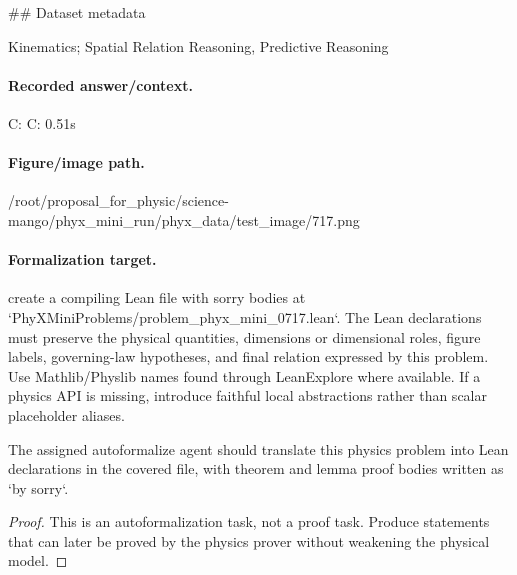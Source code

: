 \#\# Dataset metadata

Kinematics; Spatial Relation Reasoning, Predictive Reasoning

\paragraph{Recorded answer/context.}
C: C: 0.51s

\paragraph{Figure/image path.}
/root/proposal\_for\_physic/science-mango/phyx\_mini\_run/phyx\_data/test\_image/717.png

\paragraph{Formalization target.}
create a compiling Lean file with sorry bodies at `PhyXMiniProblems/problem\_phyx\_mini\_0717.lean`. The Lean declarations must preserve the physical quantities, dimensions or dimensional roles, figure labels, governing-law hypotheses, and final relation expressed by this problem.
Use Mathlib/Physlib names found through LeanExplore where available. If a physics API is missing, introduce faithful local abstractions rather than scalar placeholder aliases.

\begin{theorem}
\label{thm:physics:phyx_mini_0717:target}
The assigned autoformalize agent should translate this physics problem into Lean declarations in the covered file, with theorem and lemma proof bodies written as `by sorry`.
\end{theorem}
\begin{proof}
This is an autoformalization task, not a proof task. Produce statements that can later be proved by the physics prover without weakening the physical model.
\end{proof}

